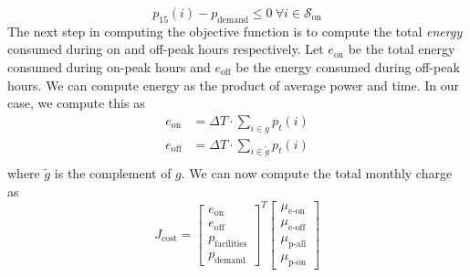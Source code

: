 \begin{equation}\label{eqn:objective:pDem}
	p_{15}(i) - p_{\text{demand}} \le 0 \ \forall i \in \mathcal{S}_{\text{on}}
\end{equation}
The next step in computing the objective function is to compute the total {\it energy} consumed during on and off-peak hours respectively.  Let $e_{\text{on}}$ be the total energy consumed during on-peak hours and $e_{\text{off}}$ be the energy consumed during off-peak hours. We can compute energy as the product of average power and time.  In our case, we compute this as 
\begin{equation}\label{eqn:objective:energy}\begin{aligned}
	e_{\text{on}} &= \Delta T\cdot \sum_{i \in g}p_t(i) \\ 
	e_{\text{off}} &= \Delta T\cdot \sum_{i \in \tilde{g}}p_t(i) \\ 
\end{aligned}\end{equation}
where $\tilde{g}$ is the complement of $g$. We can now compute the total monthly charge as
\begin{equation}
J_{\text{cost}} = \begin{bmatrix}e_{\text{on}} \\ e_{\text{off}} \\ p_{\text{facilities}} \\ p_{\text{demand}} \end{bmatrix}^T \begin{bmatrix} \mu_{\text{e-on}} \\ \mu_{\text{e-off}} \\ \mu_{\text{p-all}} \\ \mu_{\text{p-on}} \end{bmatrix} 
\end{equation}

